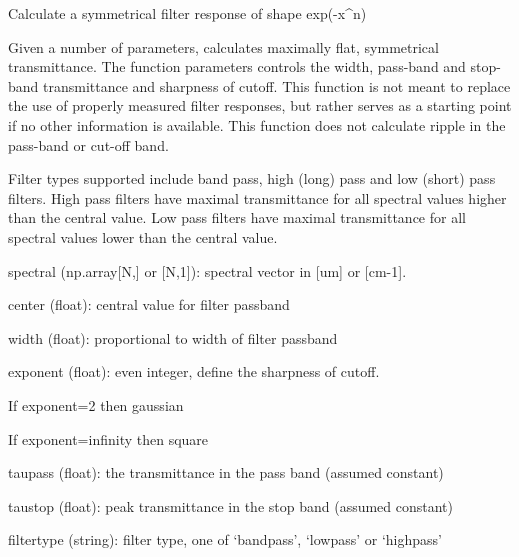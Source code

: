 \documentclass[a4paper,10pt,english]{sphinxmanual}
\begin{document}

\begin{fulllineitems}
\label{ryutils:pyradi.ryutils.sfilter}
Calculate a symmetrical filter response of shape exp(-x\textasciicircum{}n)

Given a number of parameters, calculates maximally flat,
symmetrical transmittance.  The function parameters controls
the width, pass-band and stop-band transmittance and sharpness
of cutoff. This function is not meant to replace the use of
properly measured filter responses, but rather serves as a
starting point if no other information is available.
This function does not calculate ripple in the pass-band
or cut-off band.

Filter types supported include band pass, high (long) pass and
low (short) pass filters. High pass filters have maximal
transmittance for all spectral values higher than the central
value. Low pass filters have maximal transmittance for all
spectral values lower than the central value.
\begin{description}
\item[{Args:}] \leavevmode
\begin{DUlineblock}{0em}
\item[] spectral (np.array{[}N,{]} or {[}N,1{]}): spectral vector in  {[}um{]} or {[}cm-1{]}.
\item[] center (float): central value for filter passband
\item[] width (float): proportional to width of filter passband
\item[] exponent (float): even integer, define the sharpness of cutoff.
\item[]
\begin{DUlineblock}{\DUlineblockindent}
\item[] If exponent=2        then gaussian
\item[] If exponent=infinity then square
\end{DUlineblock}
\item[] taupass (float): the transmittance in the pass band (assumed constant)
\item[] taustop (float): peak transmittance in the stop band (assumed constant)
\item[] filtertype (string): filter type, one of `bandpass', `lowpass' or `highpass'
\end{DUlineblock}


\end{description}
\end{fulllineitems}
\end{document}
